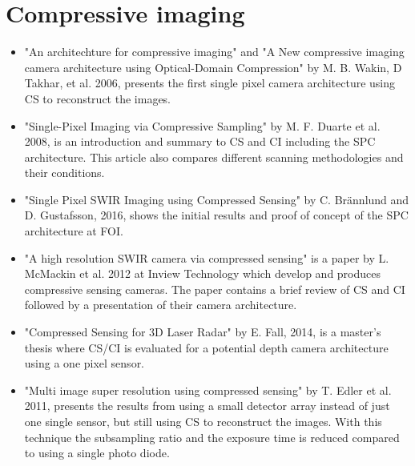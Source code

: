 \section{Compressive imaging}
\begin{itemize}

\item \cite{article:an_Arcitecture_for_CI,article:a_new_ci_arc} "An architechture for compressive imaging" and "A New compressive imaging camera architecture using Optical-Domain Compression" by M. B. Wakin, D Takhar, et al. 2006, presents the first single pixel camera architecture using CS to reconstruct the images. 

\item \cite{article:single_pixel_im_cs} "Single-Pixel Imaging via Compressive Sampling" by M. F. Duarte et al. 2008, is an introduction and summary to CS and CI including the SPC architecture. This article also compares different scanning methodologies and their conditions.   

\item \cite{article:foiSPIS} "Single Pixel SWIR Imaging using Compressed Sensing" by C. Br\"{a}nnlund and D. Gustafsson, 2016, shows the initial results and proof of concept of the SPC architecture at FOI.
  


\item \cite{article:a_high_res_swir} "A high resolution SWIR camera via compressed sensing" is a paper by L. McMackin et al. 2012 at Inview Technology which develop and produces compressive sensing cameras. The paper contains a brief review of CS and CI followed by a presentation of their camera architecture. 

 
\item \cite{mt:EF} "Compressed Sensing for 3D Laser Radar" by E. Fall, 2014, is a master's thesis where CS/CI is evaluated for a potential depth camera architecture using a one pixel sensor.   

\item \cite{article:misuperres} "Multi image super resolution using compressed sensing" by T. Edler et al. 2011, presents the results from using a small detector array instead of just one single sensor, but still using CS to reconstruct the images. With this technique the subsampling ratio and the exposure time is reduced compared to using a single photo diode. 

 
	
\end{itemize}
    
